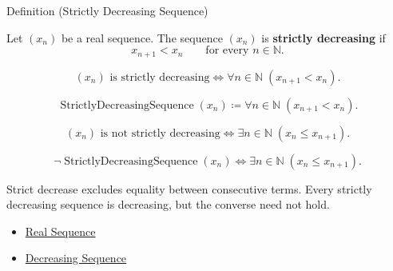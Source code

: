 
\begin{definitionbox}{Definition (Strictly Decreasing Sequence)}
\begin{definition}
\label{def:strictly-decreasing-sequence}
Let $(x_n)$ be a real sequence. The sequence $(x_n)$ is
\textbf{strictly decreasing} if
\[
  x_{n+1} < x_n
  \qquad
  \text{for every } n\in\mathbb{N}.
\]
\end{definition}
\end{definitionbox}

\begin{remark*}
\[
(x_n)\text{ is strictly decreasing}
\Longleftrightarrow
\forall n\in\mathbb{N}\;(x_{n+1}<x_n).
\]
\end{remark*}

\begin{remark*}
\[
\operatorname{StrictlyDecreasingSequence}(x_n)
\coloneqq
\forall n\in\mathbb{N}\;(x_{n+1}<x_n).
\]
\end{remark*}

\begin{remark*}
\[
(x_n)\text{ is not strictly decreasing}
\Longleftrightarrow
\exists n\in\mathbb{N}\;(x_n\le x_{n+1}).
\]
\end{remark*}

\begin{remark*}
\[
\neg\operatorname{StrictlyDecreasingSequence}(x_n)
\Longleftrightarrow
\exists n\in\mathbb{N}\;(x_n\le x_{n+1}).
\]
\end{remark*}

\begin{remark*}[Interpretation]
Strict decrease excludes equality between consecutive terms. Every strictly
decreasing sequence is decreasing, but the converse need not hold.
\end{remark*}

\begin{dependencies}
\begin{itemize}
  \item \hyperref[def:real-sequence]{Real Sequence}
  \item \hyperref[def:decreasing-sequence]{Decreasing Sequence}
\end{itemize}
\end{dependencies}

